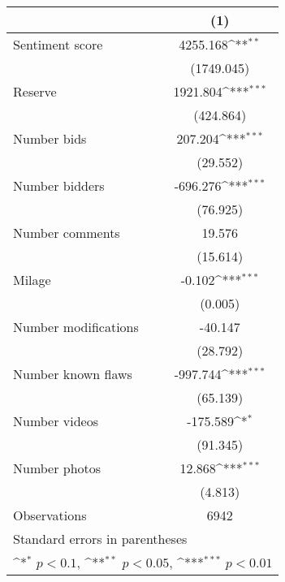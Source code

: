 {
\def\sym#1{\ifmmode^{#1}\else\(^{#1}\)\fi}
\begin{tabular}{l*{1}{c}}
\hline\hline
                    &\multicolumn{1}{c}{(1)}         \\
\hline
Sentiment score     &    4255.168\sym{**} \\
                    &  (1749.045)         \\
[1em]
Reserve             &    1921.804\sym{***}\\
                    &   (424.864)         \\
[1em]
Number bids         &     207.204\sym{***}\\
                    &    (29.552)         \\
[1em]
Number bidders      &    -696.276\sym{***}\\
                    &    (76.925)         \\
[1em]
Number comments     &      19.576         \\
                    &    (15.614)         \\
[1em]
Milage              &      -0.102\sym{***}\\
                    &     (0.005)         \\
[1em]
Number modifications&     -40.147         \\
                    &    (28.792)         \\
[1em]
Number known flaws  &    -997.744\sym{***}\\
                    &    (65.139)         \\
[1em]
Number videos       &    -175.589\sym{*}  \\
                    &    (91.345)         \\
[1em]
Number photos       &      12.868\sym{***}\\
                    &     (4.813)         \\
\hline
Observations        &        6942         \\
\hline\hline
\multicolumn{2}{l}{\footnotesize Standard errors in parentheses}\\
\multicolumn{2}{l}{\footnotesize \sym{*} \(p<0.1\), \sym{**} \(p<0.05\), \sym{***} \(p<0.01\)}\\
\end{tabular}
}
